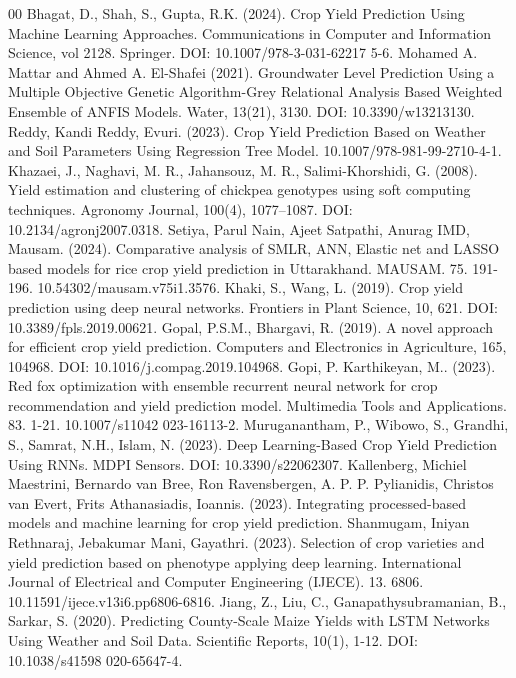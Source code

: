 \documentclass[conference]{IEEEtran}
\begin{document}
\begin{thebibliography}{00}
 Bhagat, D., Shah, S., Gupta, R.K. (2024). Crop Yield Prediction Using Machine Learning Approaches. Communications in Computer and Information Science, vol 2128. Springer. DOI: 10.1007/978-3-031-62217 5-6. 
 Mohamed A. Mattar and Ahmed A. El-Shafei (2021). Groundwater Level Prediction Using a Multiple Objective Genetic Algorithm-Grey Relational Analysis Based Weighted Ensemble of ANFIS Models. Water, 13(21), 3130. DOI: 10.3390/w13213130. 
 Reddy, Kandi Reddy, Evuri. (2023). Crop Yield Prediction Based on Weather and Soil Parameters Using Regression Tree Model. 10.1007/978-981-99-2710-4-1. 
 Khazaei, J., Naghavi, M. R., Jahansouz, M. R., Salimi-Khorshidi, G. (2008). Yield estimation and clustering of chickpea genotypes using soft computing techniques. Agronomy Journal, 100(4), 1077–1087. DOI: 10.2134/agronj2007.0318. 
 Setiya, Parul Nain, Ajeet Satpathi, Anurag IMD, Mausam. (2024). Comparative analysis of SMLR, ANN, Elastic net and LASSO based models for rice crop yield prediction in Uttarakhand. MAUSAM. 75. 191-196. 10.54302/mausam.v75i1.3576. 
 Khaki, S., Wang, L. (2019). Crop yield prediction using deep neural networks. Frontiers in Plant Science, 10, 621. DOI: 10.3389/fpls.2019.00621. 
 Gopal, P.S.M., Bhargavi, R. (2019). A novel approach for efficient crop yield prediction. Computers and Electronics in Agriculture, 165, 104968. DOI: 10.1016/j.compag.2019.104968. 
 Gopi, P. Karthikeyan, M.. (2023). Red fox optimization with ensemble recurrent neural network for crop recommendation and yield prediction model. Multimedia Tools and Applications. 83. 1-21. 10.1007/s11042 023-16113-2. 
 Muruganantham, P., Wibowo, S., Grandhi, S., Samrat, N.H., Islam, N. (2023). Deep Learning-Based Crop Yield Prediction Using RNNs. MDPI Sensors. DOI: 10.3390/s22062307. 
 Kallenberg, Michiel Maestrini, Bernardo van Bree, Ron Ravensbergen, A. P. P. Pylianidis, Christos van Evert, Frits Athanasiadis, Ioannis. (2023). Integrating processed-based models and machine learning for crop yield prediction.
 Shanmugam, Iniyan Rethnaraj, Jebakumar Mani, Gayathri. (2023). Selection of crop varieties and yield prediction based on phenotype applying deep learning. International Journal of Electrical and Computer Engineering (IJECE). 13. 6806. 10.11591/ijece.v13i6.pp6806-6816. 
 Jiang, Z., Liu, C., Ganapathysubramanian, B., Sarkar, S. (2020). Predicting County-Scale Maize Yields with LSTM Networks Using Weather and Soil Data. Scientific Reports, 10(1), 1-12. DOI: 10.1038/s41598 020-65647-4. 

\end{thebibliography}
\end{document}
